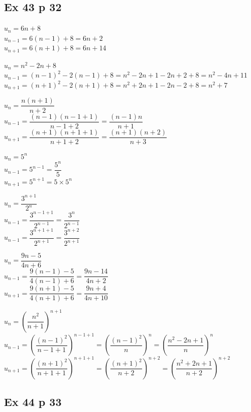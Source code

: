 \documentclass[a4paper,french]{book}
\begin{document}
\subsection*{Ex 43 p 32}

\begin{enumMet}
    \item $u_{n}=6 n+8$\\
    $u_{n-1}=6(n-1)+8=6 n+2$\\
    $u_{n+1}=6(n+1)+8=6 n+14$
    \item $u_{n}=n^{2}-2 n+8$\\
    $u_{n-1}=(n-1)^{2}-2(n-1)+8=n^{2}-2 n+1-2 n+2+8=n^{2}-4 n+11$\\
    $u_{n+1}=(n+1)^{2}-2(n+1)+8=n^{2}+2 n+1-2 n-2+8=n^{2}+7$
    \item $u_{n}=\dfrac{n(n+1)}{n+2}$\\
    $u_{n-1}=\dfrac{(n-1)(n-1+1)}{n-1+2}=\dfrac{(n-1) n}{n+1}$\\
    $u_{n+1}=\dfrac{(n+1)(n+1+1)}{n+1+2}=\dfrac{(n+1)(n+2)}{n+3}$\\
    \item $u_{n}=5^{n}$\\
    $u_{n-1}=5^{n-1}=\dfrac{5^{n}}{5}$\\
    $u_{n+1}=5^{n+1}=5 \times 5^{n}$\\
    \item $u_{n}=\dfrac{3^{n+1}}{2^{n}}$\\
    $u_{n-1}=\dfrac{3^{n-1+1}}{2^{n-1}}=\dfrac{3^{n}}{2^{n-1}}$\\
    $u_{n-1}=\dfrac{3^{n+1+1}}{2^{n+1}}=\dfrac{3^{n+2}}{2^{n+1}}$
    \item $u_{n}=\dfrac{9 n-5}{4 n+6}$\\
    $u_{n-1}=\dfrac{9(n-1)-5}{4(n-1)+6}=\dfrac{9 n-14}{4 n+2}$\\
    $u_{n+1}=\dfrac{9(n+1)-5}{4(n+1)+6}=\dfrac{9 n+4}{4 n+10}$
    \item $u_{n}=\left(\dfrac{n^{2}}{n+1}\right)^{n+1}$\\
    $u_{n-1}=\left(\dfrac{(n-1)^{2}}{n-1+1}\right)^{n-1+1}=\left(\dfrac{(n-1)^{2}}{n}\right)^{n}=\left(\dfrac{n^{2}-2 n+1}{n}\right)^{n}$\\
    $u_{n+1}=\left(\dfrac{(n+1)^{2}}{n+1+1}\right)^{n+1+1}=\left(\dfrac{(n+1)^{2}}{n+2}\right)^{n+2}=\left(\dfrac{n^{2}+2 n+1}{n+2}\right)^{n+2}$
\end{enumMet}

\subsection*{Ex 44 p 33}
\end{document}
